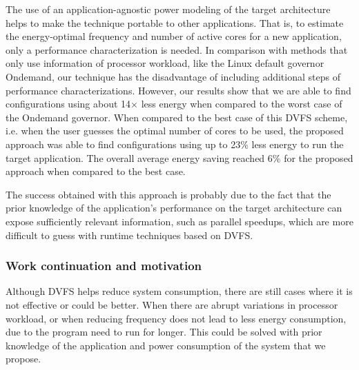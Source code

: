 
The use of an application-agnostic power modeling of the target architecture helps to make the technique portable to other applications. That is, to estimate the energy-optimal frequency and number of active cores for a new application, only a performance characterization is needed. In comparison with methods that only use information of processor workload, like the Linux default governor Ondemand, our technique has the disadvantage of including additional steps of performance characterizations. However, our results show that we are able to find configurations using about 14$\times$ less energy when compared to the worst case of the Ondemand governor. When compared to the best case of this DVFS scheme, i.e. when the user guesses the optimal number of cores to be used, the proposed approach was able to find configurations using up to 23\% less energy to run the target application. The overall average energy saving reached 6\% for the proposed approach when compared to the best case.


The success obtained with this approach is probably due to the fact that the prior knowledge of the application's performance on the target architecture can expose sufficiently relevant information, such as parallel speedups, which are more difficult to guess with runtime techniques based on DVFS.


\subsubsection{Work continuation and motivation}

Although DVFS helps reduce system consumption, there are still cases where it is not effective or could be better. When there are abrupt variations in processor workload,  or when reducing frequency does not lead to less energy consumption, due to the program need to run for longer. This could be solved with prior knowledge of the application and power consumption of the system that we propose.

